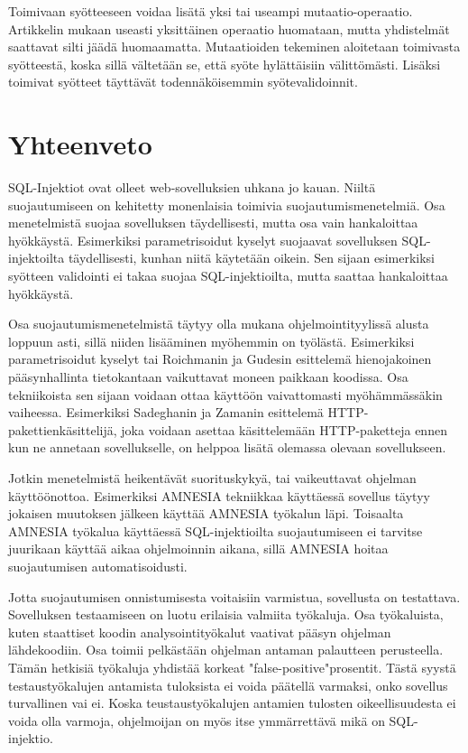 \documentclass[finnish]{tktltiki2}
\theoremstyle{definition}
\theoremstyle{remark}
\begin{document}
	Toimivaan syötteeseen voidaa lisätä yksi tai useampi mutaatio-operaatio. Artikkelin mukaan useasti yksittäinen operaatio huomataan, mutta yhdistelmät saattavat silti jäädä huomaamatta. Mutaatioiden tekeminen aloitetaan toimivasta syötteestä, koska sillä vältetään se, että syöte hylättäisiin välittömästi. Lisäksi toimivat syötteet täyttävät todennäköisemmin syötevalidoinnit. 
	
	\section {Yhteenveto}
	SQL-Injektiot ovat olleet web-sovelluksien uhkana jo kauan. Niiltä suojautumiseen on kehitetty monenlaisia toimivia suojautumismenetelmiä. Osa menetelmistä suojaa sovelluksen täydellisesti, mutta osa vain hankaloittaa hyökkäystä. Esimerkiksi parametrisoidut kyselyt suojaavat sovelluksen SQL-injektoilta täydellisesti, kunhan niitä käytetään oikein. Sen sijaan esimerkiksi syötteen validointi ei takaa suojaa SQL-injektioilta, mutta saattaa hankaloittaa hyökkäystä.
	
	Osa suojautumismenetelmistä täytyy olla mukana ohjelmointityylissä alusta loppuun asti, sillä niiden lisääminen myöhemmin on työlästä. Esimerkiksi parametrisoidut kyselyt tai Roichmanin ja Gudesin esittelemä hienojakoinen pääsynhallinta tietokantaan vaikuttavat moneen paikkaan koodissa. Osa tekniikoista sen sijaan voidaan ottaa käyttöön vaivattomasti myöhämmässäkin vaiheessa. Esimerkiksi Sadeghanin ja Zamanin esittelemä HTTP-pakettienkäsittelijä, joka voidaan asettaa käsittelemään HTTP-paketteja ennen kun ne annetaan sovellukselle, on helppoa lisätä olemassa olevaan sovellukseen. 
	
	Jotkin menetelmistä heikentävät suorituskykyä, tai vaikeuttavat ohjelman käyttöönottoa. Esimerkiksi AMNESIA tekniikkaa käyttäessä sovellus täytyy jokaisen muutoksen jälkeen käyttää AMNESIA työkalun läpi. Toisaalta AMNESIA työkalua käyttäessä SQL-injektioilta suojautumiseen ei tarvitse juurikaan käyttää aikaa ohjelmoinnin aikana, sillä AMNESIA hoitaa suojautumisen automatisoidusti.
	
	Jotta suojautumisen onnistumisesta voitaisiin varmistua, sovellusta on testattava. Sovelluksen testaamiseen on luotu erilaisia valmiita työkaluja. Osa työkaluista, kuten staattiset koodin analysointityökalut vaativat pääsyn ohjelman lähdekoodiin. Osa toimii pelkästään ohjelman antaman palautteen perusteella. Tämän hetkisiä työkaluja yhdistää korkeat "false-positive"\space prosentit. Tästä syystä testaustyökalujen antamista tuloksista ei voida päätellä varmaksi, onko sovellus turvallinen vai ei. Koska teustaustyökalujen antamien tulosten oikeellisuudesta ei voida olla varmoja, ohjelmoijan on myös itse ymmärrettävä mikä on SQL-injektio.
	
\end{document}
